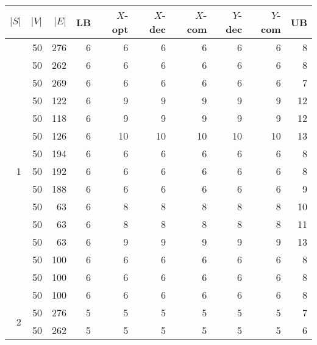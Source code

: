 \begin{table}[]
\begin{tabular}{rrrrrrrrrr}
$|S|$               & $|V|$ & $|E|$ & LB & $X$-opt & $X$-dec & $X$-com & $Y$-dec & $Y$-com & UB    \\\hline
\multirow{15}{*}{1} & 50  & 276   & 6  & 6       & 6       & 6       & 6       & 6       & 8  \\
                    & 50  & 262   & 6  & 6       & 6       & 6       & 6       & 6       & 8  \\
                    & 50  & 269   & 6  & 6       & 6       & 6       & 6       & 6       & 7  \\
                    & 50  & 122   & 6  & 9       & 9       & 9       & 9       & 9       & 12 \\
                    & 50  & 118   & 6  & 9       & 9       & 9       & 9       & 9       & 12 \\
                    & 50  & 126   & 6  & 10      & 10      & 10      & 10      & 10      & 13 \\
                    & 50  & 194   & 6  & 6       & 6       & 6       & 6       & 6       & 8  \\
                    & 50  & 192   & 6  & 6       & 6       & 6       & 6       & 6       & 8  \\
                    & 50  & 188   & 6  & 6       & 6       & 6       & 6       & 6       & 9  \\
                    & 50  & 63    & 6  & 8       & 8       & 8       & 8       & 8       & 10 \\
                    & 50  & 63    & 6  & 8       & 8       & 8       & 8       & 8       & 11 \\
                    & 50  & 63    & 6  & 9       & 9       & 9       & 9       & 9       & 13 \\
                    & 50  & 100   & 6  & 6       & 6       & 6       & 6       & 6       & 8  \\
                    & 50  & 100   & 6  & 6       & 6       & 6       & 6       & 6       & 8  \\
                    & 50  & 100   & 6  & 6       & 6       & 6       & 6       & 6       & 8  \\\hline
\multirow{15}{*}{2} & 50  & 276   & 5  & 5       & 5       & 5       & 5       & 5       & 7     \\
                    & 50  & 262   & 5  & 5       & 5       & 5       & 5       & 5       & 6     \\

\end{tabular}
\end{table}
